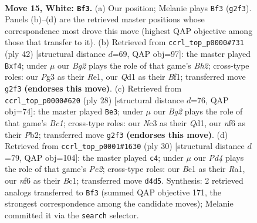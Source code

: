 \documentclass[11pt]{article}
\begin{document}
\clearpage

\begin{figure}[p]\centering
\begin{subfigure}{0.46\textwidth}\centering
\resizebox{\linewidth}{!}{%
\newchessgame
\chessboard[
  setfen={r2rb1k1/p1q1bpp1/npp1pn2/7p/P1NP1P2/1PN3P1/4P1BP/R1BQR1K1 w - - 0 15},
  showmover=false,
  pgfstyle=straightmove, color=movearrow, markmove={g2-f3}
]}
\caption{}
\end{subfigure}\hfill
\begin{subfigure}{0.46\textwidth}\centering
\resizebox{\linewidth}{!}{%
\newchessgame
\chessboard[
  setfen={2rr1bk1/1bq2p2/pp1ppn1p/4n3/P1PNPp2/1PN4P/2QR2PB/4RB1K w - - 0 22},
  showmover=false,
  pgfstyle=straightmove, color=movearrow, markmove={h2-f4}
]}
\caption{}
\end{subfigure}
\\[4pt]
\begin{subfigure}{0.46\textwidth}\centering
\resizebox{\linewidth}{!}{%
\newchessgame
\chessboard[
  setfen={r1bq1rk1/1pp1n1b1/3p3p/p1nPpp2/2P4N/P1N3P1/RP3PBP/2BQR1K1 w - - 2 15},
  showmover=false,
  pgfstyle=straightmove, color=movearrow, markmove={c1-e3}
]}
\caption{}
\end{subfigure}\hfill
\begin{subfigure}{0.46\textwidth}\centering
\resizebox{\linewidth}{!}{%
\newchessgame
\chessboard[
  setfen={r1r3k1/1b1qbppp/pp1ppn2/8/P2NP3/6P1/1PP1QPBP/R1BR2K1 w - - 2 16},
  showmover=false,
  pgfstyle=straightmove, color=movearrow, markmove={c2-c4}
]}
\caption{}
\end{subfigure}
\caption{\textbf{Move 15, White: \texttt{Bf3}.} (a) Our position; Melanie plays \texttt{Bf3} (\texttt{g2f3}). Panels (b)--(d) are the retrieved master positions whose correspondence most drove this move (highest QAP objective among those that transfer to it). (b) Retrieved from \texttt{ccrl\_top\_p0000\#731} (ply 42) [structural distance $d$=69, QAP obj=97]: the master played \texttt{Bxf4}; under $\mu$ our \emph{Bg2} plays the role of that game's \emph{Bh2}; cross-type roles: our \emph{P}g3 as their \emph{R}e1, our \emph{Q}d1 as their \emph{B}f1; transferred move \texttt{g2f3} \textbf{(endorses this move)}. (c) Retrieved from \texttt{ccrl\_top\_p0000\#620} (ply 28) [structural distance $d$=76, QAP obj=74]: the master played \texttt{Be3}; under $\mu$ our \emph{Bg2} plays the role of that game's \emph{Bc1}; cross-type roles: our \emph{N}c3 as their \emph{Q}d1, our \emph{n}f6 as their \emph{P}b2; transferred move \texttt{g2f3} \textbf{(endorses this move)}. (d) Retrieved from \texttt{ccrl\_top\_p0001\#1630} (ply 30) [structural distance $d$=79, QAP obj=104]: the master played \texttt{c4}; under $\mu$ our \emph{Pd4} plays the role of that game's \emph{Pc2}; cross-type roles: our \emph{B}c1 as their \emph{R}a1, our \emph{n}f6 as their \emph{B}c1; transferred move \texttt{d4d5}. Synthesis: 2 retrieved analogs transferred to \texttt{Bf3} (summed QAP objective 171, the strongest correspondence among the candidate moves); Melanie committed it via the \texttt{search} selector.}
\label{fig:thought-m28}
\end{figure}
\end{document}
